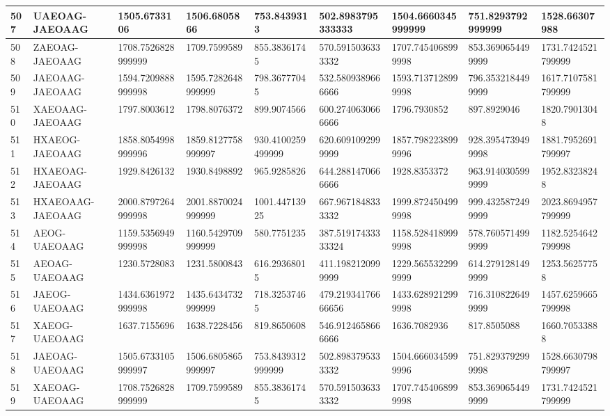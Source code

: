 {\begin{longtable}{|l|l|l|l|l|l|l|l|l|}
        507 & UAEOAG-JAEOAAG & 1505.6733106 & 1506.6805866 & 753.8439313 & 502.8983795333333 & 1504.6660345999999 & 751.8293792999999 & 1528.66307988 \\ \hline
        508 & ZAEOAG-JAEOAAG & 1708.7526828999999 & 1709.7599589 & 855.38361745 & 570.5915036333332 & 1707.7454068999998 & 853.3690654499999 & 1731.7424521799999 \\ \hline
        509 & JAEOAAG-JAEOAAG & 1594.7209888999998 & 1595.7282648999999 & 798.36777045 & 532.5809389666666 & 1593.7137128999998 & 796.3532184499999 & 1617.7107581799999 \\ \hline
        510 & XAEOAAG-JAEOAAG & 1797.8003612 & 1798.8076372 & 899.9074566 & 600.2740630666666 & 1796.7930852 & 897.8929046 & 1820.79013048 \\ \hline
        511 & HXAEOG-JAEOAAG & 1858.8054998999996 & 1859.8127758999997 & 930.4100259499999 & 620.6091092999999 & 1857.7982238999996 & 928.3954739499998 & 1881.7952691799997 \\ \hline
        512 & HXAEOAG-JAEOAAG & 1929.8426132 & 1930.8498892 & 965.9285826 & 644.2881470666666 & 1928.8353372 & 963.9140305999999 & 1952.83238248 \\ \hline
        513 & HXAEOAAG-JAEOAAG & 2000.8797264999998 & 2001.8870024999999 & 1001.44713925 & 667.9671848333332 & 1999.8724504999998 & 999.4325872499999 & 2023.8694957799999 \\ \hline
        514 & AEOG-UAEOAAG & 1159.5356949999998 & 1160.5429709999999 & 580.7751235 & 387.51917433333324 & 1158.5284189999998 & 578.7605714999999 & 1182.5254642799998 \\ \hline
        515 & AEOAG-UAEOAAG & 1230.5728083 & 1231.5800843 & 616.29368015 & 411.1982120999999 & 1229.5655322999999 & 614.2791281499999 & 1253.56257758 \\ \hline
        516 & JAEOG-UAEOAAG & 1434.6361972999998 & 1435.6434732999999 & 718.32537465 & 479.21934176666656 & 1433.6289212999998 & 716.3108226499999 & 1457.6259665799998 \\ \hline
        517 & XAEOG-UAEOAAG & 1637.7155696 & 1638.7228456 & 819.8650608 & 546.9124658666666 & 1636.7082936 & 817.8505088 & 1660.70533888 \\ \hline
        518 & JAEOAG-UAEOAAG & 1505.6733105999997 & 1506.6805865999997 & 753.8439312999999 & 502.8983795333332 & 1504.6660345999996 & 751.8293792999998 & 1528.6630798799997 \\ \hline
        519 & XAEOAG-UAEOAAG & 1708.7526828999999 & 1709.7599589 & 855.38361745 & 570.5915036333332 & 1707.7454068999998 & 853.3690654499999 & 1731.7424521799999 \\ \hline

\end{longtable}}
